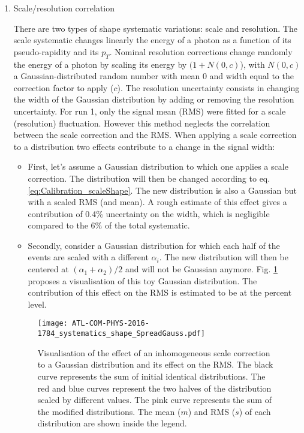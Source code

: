 \begin{enumerate}
\item Scale/resolution correlation
\label{sec:orgacf66e0}
\label{sec:syst_shape_massResCorr}

There are two types of shape systematic variations: scale and resolution.
The scale systematic changes linearly the energy of a photon as a function of its pseudo-rapidity and its \(p_T\).
Nominal resolution corrections change randomly the energy of a photon by scaling its energy by \((1+N(0,c)\)), with \(N(0,c)\) a Gaussian-distributed random number with mean 0 and width equal to the correction factor to apply (\(c\)).
The resolution uncertainty consists in changing the width of the Gaussian distribution by adding or removing the resolution uncertainty.
For run 1, only the signal mean (RMS) were fitted for a scale (resolution) fluctuation.
However this method neglects the correlation between the scale correction and the RMS.
When applying a scale correction to a distribution two effects contribute to a change in the signal width:

\begin{itemize}
\item First, let's assume a Gaussian distribution to which one applies a scale correction.
The distribution will then be changed according to eq. \ref{eq:Calibration_scaleShape}.
The new distribution is also a Gaussian but  with a scaled RMS (and mean).
A rough estimate of this effect gives a contribution of 0.4\% uncertainty on the width, which is negligible compared to the 6\% of the total systematic.
\end{itemize}


\begin{itemize}
\item Secondly, consider a Gaussian distribution for which each half of the events are scaled with a different \(\alpha_i\).
The new distribution will then be centered at \((\alpha_1+\alpha_2)/2\) and will not be Gaussian anymore.
Fig. \ref{fig:org861f6a5} proposes a visualisation of this toy Gaussian distribution.
The contribution of this effect on the RMS is estimated to be at the percent level.
\end{itemize}

\begin{figure}[htbp]
\centering
\texttt{[image: ATL-COM-PHYS-2016-1784\_systematics\_shape\_SpreadGauss.pdf]}
\caption{\label{fig:org861f6a5}
  Visualisation of the effect of an inhomogeneous scale correction to a Gaussian distribution and its effect on the RMS.
  The black curve represents the sum of initial identical distributions.
  The red and blue curves represent the two halves of the distribution scaled by different values.
  The pink curve represents the sum of the modified distributions.
  The mean (\(m\)) and RMS (\(s\)) of each distribution are shown inside the legend.}
\end{figure}


\end{enumerate}
